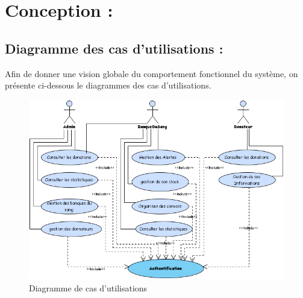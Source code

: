 \documentclass[12pt,a4paper,twoside]{report}
\begin{document}
	\section{Conception :}{
		
			\subsection{Diagramme des cas d'utilisations :}{
				Afin de donner une vision globale du comportement fonctionnel du système, on présente ci-dessous le diagrammes des cas d’utilisations.
								\begin{figure}[H]
									 \includegraphics[width=13cm]{Images/usecase.png}
									 \centering
									 \caption{\label{usd1} Diagramme de cas d'utilisations}
								\end{figure}
						
			}
	
}
\end{document}
